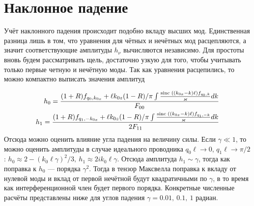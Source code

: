\section{Наклонное падение}

Учёт наклонного падения происходит подобно вкладу высших мод. Единственная разница лишь в том, что уравнения для чётных и нечётных мод расцепляются, а значит соответствующие амплитуды $h_\nu$ вычисляются независимо. Для простоты вновь будем рассматривать щель, достаточно узкую  для того, чтобы учитывать только первые четную и нечётную моды. Так как уравнения расцепились, то можно компактно выписать значения амплитуд

\begin{eqnarray}
  h_0 = \frac{(1+R)f_{q_0,k_{0x}} + \ell k_{0z}(1-R)/\pi \int \frac{\mathrm{sinc}\;((k_{0x}-k)\ell) f_{q_0,k} }{\varkappa} dk }{F_{00} } \\
  h_1 = \frac{(1+R)f_{q_1,-k_{0x}} + \ell k_{0z}(1-R)/\pi \int \frac{\mathrm{sinc}\;((k_{0x}-k)\ell) f_{q_1,-k} }{\varkappa} dk }{2F_{11}}
\end{eqnarray}
Отсюда можно оценить влияние угла падения на величину силы. Если $\gamma\ll 1$, то можно оценить амплитуды в случае идеального проводника $q_0 \ell \to 0$, $q_1 \ell \to \pi/2$:
$h_0 \approx 2-(k_0\ell \gamma)^2/3,~h_1 \approx  2 i  k_0\ell \gamma$. Отсюда амплитуда $h_1\sim \gamma$, тогда как поправка к $h_0$ --- порядка $\gamma^2$. Тогда в тензор Максвелла поправка к вкладу от нулевой моды и вклад от первой нечётной будут квадратичными по $\gamma$, в то время как интерференционной член будет первого порядка. 
Конкретные численные расчёты представлены ниже для углов падения $\gamma = 0.01,\ 0.1,\ 1$ радиан.
